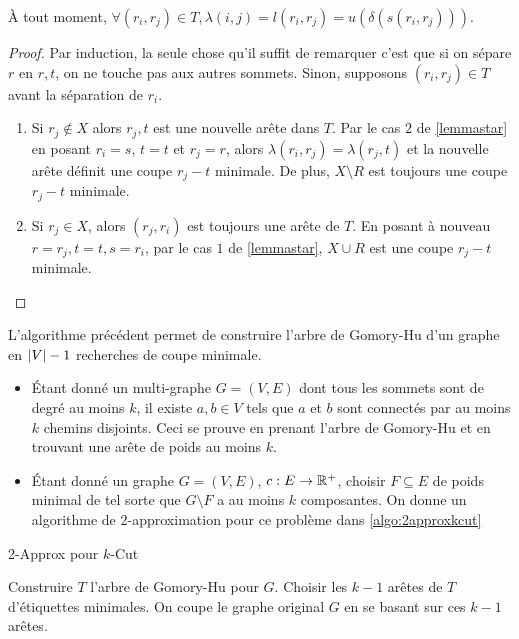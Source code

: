 \documentclass[math, info]{cours}
\begin{document}
\begin{lemme}
	À tout moment, $\forall (r_{i}, r_{j}) \in T, \lambda(i, j) = l(r_{i}, r_{j}) = u(\delta(s(r_{i}, r_{j})))$.
\end{lemme}
\begin{proof}
	Par induction, la seule chose qu'il suffit de remarquer c'est que si on sépare $r$ en $r, t$, on ne touche pas aux autres sommets.
	Sinon, supposons $(r_{i}, r_{j})\in T$ avant la séparation de $r_{i}$.
	\begin{enumerate}
		\item Si $r_{j} \notin X$ alors $r_{j}, t$ est une nouvelle arête dans $T$.
		      Par le cas $2$ de \ref{lemmastar} en posant $r_{i} = s$, $t = t$ et $r_{j} = r$, alors $\lambda(r_{i}, r_{j}) = \lambda(r_{j}, t)$ et la nouvelle arête définit une coupe $r_{j}-t$ minimale.
		      De plus, $X \setminus R$ est toujours une coupe $r_{j} - t$ minimale.
		\item Si $r_{j} \in X$, alors $(r_{j}, r_{i})$ est toujours une arête de $T$. En posant à nouveau $r = r_{j}, t=t, s=r_{i}$, par le cas $1$ de \ref{lemmastar}, $X \cup R$ est une coupe $r_{j} - t$ minimale.
	\end{enumerate}
\end{proof}

\begin{thm}
	L'algorithme précédent permet de construire l'arbre de Gomory-Hu d'un graphe en $\left|V\right| - 1$ recherches de coupe minimale.
\end{thm}

\begin{exemple}
	\begin{itemize}
		\item Étant donné un multi-graphe $G = (V, E)$ dont tous les sommets sont de degré au moins $k$, il existe $a, b\in V$ tels que $a$ et $b$ sont connectés par au moins $k$ chemins disjoints.
			Ceci se prouve en prenant l'arbre de Gomory-Hu et en trouvant une arête de poids au moins $k$.
		\item Étant donné un graphe $G = (V, E)$, $c: E \to \mathbb{R}^{+}$, choisir $F \subseteq E$ de poids minimal de tel sorte que $G\setminus F$ a au moins $k$ composantes.
			On donne un algorithme de $2$-approximation pour ce problème dans \ref{algo:2approxkcut}
	\end{itemize}
\end{exemple}
\begin{algorithm}
	\caption{2-Approx pour $k$-Cut}
	\begin{algorithmic}
		\State Construire $T$ l'arbre de Gomory-Hu pour $G$.
		\State Choisir les $k - 1$ arêtes de $T$ d'étiquettes minimales.
		\State On coupe le graphe original $G$ en se basant sur ces $k - 1$ arêtes.
	\end{algorithmic}
	\label{algo:2approxkcut}
\end{algorithm}
\end{document}

